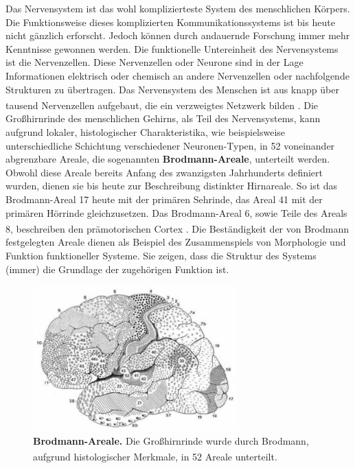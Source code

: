 \documentclass[12pt,a4paper,pdftex]{article}
\begin{document}
 Das Nervensystem ist das wohl komplizierteste System des menschlichen Körpers. Die Funktionsweise dieses komplizierten Kommunikationssystems ist bis heute nicht gänzlich erforscht. Jedoch können durch andauernde Forschung immer mehr Kenntnisse gewonnen werden. Die funktionelle Untereinheit des Nervensystems ist die Nervenzellen. Diese Nervenzellen oder Neurone sind in der Lage Informationen elektrisch oder chemisch an andere Nervenzellen oder nachfolgende Strukturen zu übertragen. Das Nervensystem des Menschen ist aus knapp über tausend Nervenzellen aufgebaut, die ein verzweigtes Netzwerk bilden \textsuperscript{\cite[1]{trepel2011neuroanatomie}}. Die Großhirnrinde des menschlichen Gehirns, als Teil des Nervensystems, kann aufgrund lokaler, histologischer Charakteristika, wie beispielsweise unterschiedliche Schichtung verschiedener Neuronen-Typen, in 52 voneinander abgrenzbare Areale, die sogenannten \textbf{Brodmann-Areale}, unterteilt werden. Obwohl diese Areale bereits Anfang des zwanzigsten Jahrhunderts definiert wurden, dienen sie bis heute zur Beschreibung distinkter Hirnareale. So ist das Brodmann-Areal 17 heute mit der primären Sehrinde, das Areal 41 mit der primären Hörrinde gleichzusetzen. Das Brodmann-Areal 6, sowie Teile des Areals 8, beschreiben den prämotorischen Cortex \textsuperscript{\cite[9]{trepel2011neuroanatomie}}. Die Beständigkeit der von Brodmann festgelegten Areale dienen als Beispiel des Zusammenspiels von Morphologie und Funktion funktioneller Systeme. Sie zeigen, dass die Struktur des Systems (immer) die Grundlage der zugehörigen Funktion ist.

\begin{figure}[H]
    \centering
    \includegraphics[width=0.7\textwidth]{pictures/Bilder_Jule/Andere/brodmann.PNG}
    \caption[Brodmann-Areale]{\textbf{Brodmann-Areale.} Die Großhirnrinde wurde durch Brodmann, aufgrund histologischer Merkmale, in 52 Areale unterteilt. \textsuperscript{\cite[9]{trepel2011neuroanatomie}}}
    \label{fig:brodmann_areale}
\end{figure}{}
\end{document}
